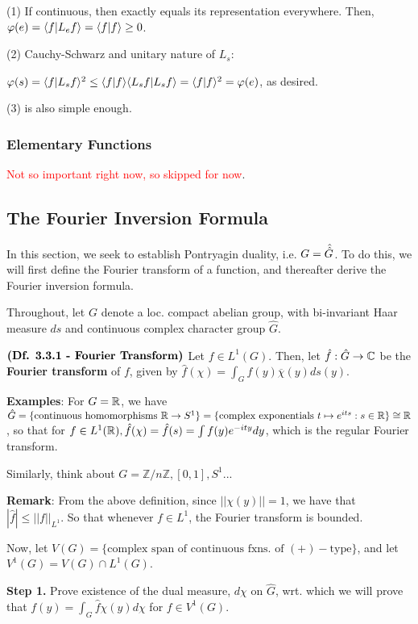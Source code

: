 \documentclass{article}
\begin{document}
(1) If continuous, then exactly equals its representation everywhere. Then, $\varphi(e) = \langle f | L_ef \rangle = \langle f | f \rangle \geq 0$.

(2) Cauchy-Schwarz and unitary nature of $L_s$: 

$\varphi(s) = \langle f | L_sf \rangle^2 \leq \langle f | f \rangle \langle L_sf | L_sf \rangle = \langle f | f \rangle^2 = \varphi(e)$, as desired.

(3) is also simple enough.

\subsubsection{Elementary Functions}

\textcolor{red}{Not so important right now, so skipped for now}.

\subsection{The Fourier Inversion Formula}
In this section, we seek to establish Pontryagin duality, i.e. $G = \hat{\hat{G}}$. To do this, we will first define the Fourier transform of a function, and thereafter derive the Fourier inversion formula. 

Throughout, let $G$ denote a loc. compact abelian group, with bi-invariant Haar measure $ds$ and continuous complex character group $\hat{G}$.

$\textbf{(Df. 3.3.1 - Fourier Transform)}$ Let $f \in L^1(G)$. Then, let $\hat{f}:\hat{G} \rightarrow \mathbb{C}$ be the \textbf{Fourier transform} of $f$, given by $\hat{f}(\chi) = \int_G f(y)\overline{\chi}(y) ds(y)$.

\textbf{Examples}: For $G = \mathbb{R}$, we have $\hat{G} = \{ \text{continuous homomorphisms $\mathbb{R} \rightarrow S^1$} \} = \{ \text{complex exponentials } t \mapsto e^{i ts}: s \in \mathbb{R} \} \cong \mathbb{R}$, so that for $f \in L^1(\mathbb{R}), \hat{f}(\chi) = \hat{f}(s) = \int f(y)e^{-ity}dy$, which is the regular Fourier transform.

Similarly, think about $G = \mathbb{Z}/n\mathbb{Z}, [0,1], S^1$...

\textbf{Remark}: From the above definition, since $||\chi(y)|| = 1$, we have that $|\hat{f}| \leq ||f||_{L^1}.$ So that whenever $f \in L^1$, the Fourier transform is bounded.

Now, let $V(G) = \{ \text{complex span of continuous fxns. of } (+)-\text{type} \}$, and let $V^1(G) = V(G) \cap L^1(G)$.  

\textbf{Step 1.} Prove existence of the dual measure, $d\chi$ on $\hat{G}$, wrt. which we will prove that $f(y) = \int_G \hat{f}\chi(y)d\chi$ for $f \in V^1(G)$.
\end{document}
